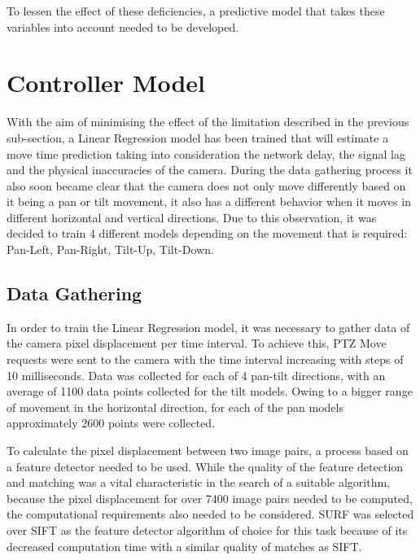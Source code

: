 \documentclass{l4proj}
\begin{document}
To lessen the effect of these deficiencies, a predictive model that takes these variables into account needed to be developed.

\section{Controller Model}

With the aim of minimising the effect of the limitation described in the previous sub-section, a Linear Regression model has been trained that will estimate a move time prediction taking into consideration the network delay, the signal lag and the physical inaccuracies of the camera. During the data gathering process it also soon became clear that the camera does not only move differently based on it being a pan or tilt movement, it also has a different behavior when it moves in different horizontal and vertical directions. Due to this observation, it was decided to train 4 different models depending on the movement that is required: Pan-Left, Pan-Right, Tilt-Up, Tilt-Down.  

\subsection{Data Gathering}


In order to train the Linear Regression model, it was necessary to gather data of the camera pixel displacement per time interval. To achieve this, PTZ Move requests were sent to the camera with the time interval increasing with steps of 10 milliseconds. Data was collected for each of 4 pan-tilt directions, with an average of 1100 data points collected for the tilt models. Owing to a bigger range of movement in the horizontal direction, for each of the pan models approximately 2600 points were collected. 


To calculate the pixel displacement between two image pairs, a process based on a feature detector needed to be used. While the quality of the feature detection and matching was a vital characteristic in the search of a suitable algorithm, because the pixel displacement for over 7400 image pairs needed to be computed, the computational requirements also needed to be considered. SURF was selected over SIFT as the feature detector algorithm of choice for this task because of its decreased computation time with a similar quality of matches as SIFT. 
\end{document}

